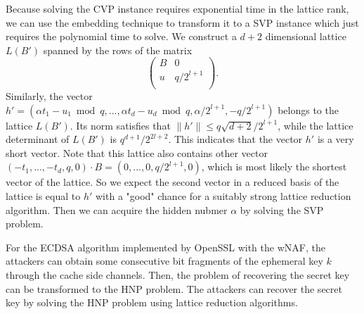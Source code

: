 Because solving the CVP instance requires exponential time in the lattice rank,
 we can use the embedding technique \cite{Nguyen1999} to transform it to a SVP instance which just requires the polynomial time to solve.
We construct a $d+2$ dimensional lattice $L(B')$ spanned by the rows of the matrix
$$
\left(
  \begin{array}{cc}
    B & 0 \\
    u & q/2^{l+1} \\
  \end{array}
\right).
$$
Similarly, the vector $h' = (\alpha t_1 - u_1 \bmod q, ..., \alpha t_d - u_d \bmod q, \alpha /2^{l+1}, -q/2^{l+1})$ belongs to the lattice $L(B')$.
 Its norm satisfies that $\|h'\| \leq q\sqrt{d+2}/2^{l+1}$,
  while the lattice determinant of $L(B')$ is $q^{d+1}/2^{2l+2}$.
   This indicates that the vector $h'$ is a very short vector.
Note that this lattice also contains other vector $(-t_1, ..., -t_d, q, 0)\cdot B = (0, ..., 0, q/2^{l+1}, 0)$,
 which is most likely the shortest vector of the lattice.
So we expect the second vector in a reduced basis of the lattice is equal to $h'$ with a "good" chance for a suitably strong lattice reduction algorithm.
Then we can acquire the hidden nubmer $\alpha$ by solving the SVP problem.


For the ECDSA algorithm implemented by OpenSSL with the wNAF,
  the attackers can obtain some consecutive bit fragments of the ephemeral key $k$ through the cache side channels.
Then, the problem of recovering the secret key can be transformed to the HNP problem.
 The attackers can recover the secret key by solving the HNP problem using lattice reduction algorithms.
 
 




